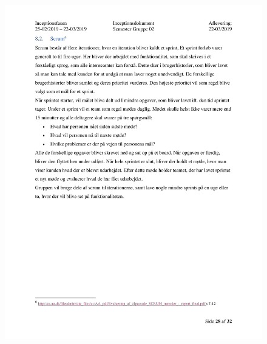 \begin{figure}[hb]
  \includegraphics[scale = 0.33]{./PNG/Inceptions/Gruppe02+InceptionsDokument-29.jpg} 
\end{figure}

